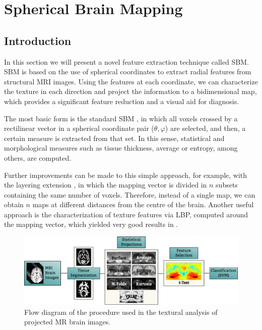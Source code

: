 \chapter{Spherical Brain Mapping}\label{ch:sbm}
\section{Introduction}
In this section we will present a novel feature extraction technique called \acf{SBM}. \ac{SBM} is based on the use of spherical coordinates to extract radial features from structural \ac{MRI} images. Using the features at each coordinate, we can characterize the texture in each direction and project the information to a bidimensional map, which provides a significant feature reduction and a visual aid for diagnosis. 

The most basic form is the standard \ac{SBM} \cite{Martinez-Murcia2014225,Martinez-Murcia2015}, in which all voxels crossed by a rectilinear vector in a spherical coordinate pair ($\theta,\varphi$) are selected, and then, a certain measure is extracted from that set. In this sense, statistical and morphological measures such as tissue thickness, average or entropy, among others, are computed. 

Further improvements can be made to this simple approach, for example, with the layering extension \cite{Martinez-Murcia2015}, in which the mapping vector is divided in $n$ subsets containing the same number of voxels. Therefore, instead of a single map, we can obtain $n$ maps at different distances from the centre of the brain. Another useful approach is the characterization of texture features via \acf{LBP}, computed around the mapping vector, which yielded very good results in \cite{Martinez-MurciaVRLBP}.

\begin{figure}[htp]
	\myfloatalign
	\includegraphics[width=\textwidth]{Graphics/ch6/01-flowdiagram}
	\caption{Flow diagram of the procedure used in the textural analysis of projected MR brain images.}
	\label{fig:flowdiagram}
\end{figure}

